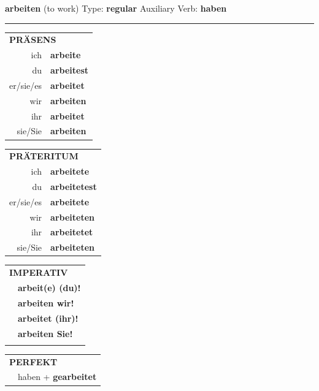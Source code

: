 \documentclass[10pt,a4paper]{revtex4-2}
\begin{document}
\begin{verbbox}
    {\Large \bf arbeiten} (to work) \hfill Type: \textbf{regular} \hfill Auxiliary Verb: \textbf{haben} 
    
     \vspace{5pt}

    \hrule
    
    \vspace{5pt}

  \begin{tabular}{rl}
     \multicolumn{2}{l}{\textbf{PRÄSENS} }\\
    ich & \textbf{arbeite}\\
    du & \textbf{arbeitest}\\
    er/sie/es & \textbf{arbeitet}\\
    wir & \textbf{arbeiten}\\
    ihr & \textbf{arbeitet}\\
    sie/Sie & \textbf{arbeiten}\\
  \end{tabular}
  \hfill
     \begin{tabular}{rl}
    \multicolumn{2}{l}{\textbf{PRÄTERITUM} }\\
    ich & \textbf{arbeitete}\\
    du & \textbf{arbeitetest}\\
    er/sie/es & \textbf{arbeitete}\\
    wir & \textbf{arbeiteten}\\
    ihr & \textbf{arbeitetet}\\
    sie/Sie & \textbf{arbeiteten}\\
  \end{tabular}
  \hfill
  \begin{tabular}{rl}
     \multicolumn{2}{l}{\textbf{IMPERATIV} }\\
   & \textbf{arbeit(e) (du)!}\\
   & \textbf{arbeiten wir!}\\
   & \textbf{arbeitet (ihr)!}\\
   & \textbf{arbeiten Sie!}\\
   & \vspace{10pt}
  \end{tabular}

    \vspace{10pt}

 \begin{tabular}{rl}
     \multicolumn{2}{l}{\textbf{PERFEKT}}\\
   & haben + \textbf{gearbeitet}\\
  \end{tabular}
\hfill
   \begin{tabular}{rl}
   

\end{tabular}
\end{verbbox}
\end{document}
